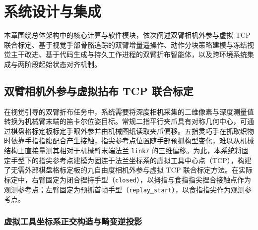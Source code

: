 \section{系统设计与集成}
\label{sec:design}

本章围绕总体架构中的核心计算与软件模块，依次阐述双臂相机外参与虚拟 TCP 联合标定、基于视觉手部骨骼追踪的双臂增量遥操作、动作分块策略建模与冻结视觉主干改进、基于代码生成与持久工作进程的双臂折布智能体，以及跨环境系统集成与两阶段起始状态对齐机制。

\subsection{双臂相机外参与虚拟拈布 TCP 联合标定}
\label{subsec:calibration}

在视觉引导的双臂折布任务中，系统需要将深度相机采集的二维像素与深度测量值转换为机械臂末端的笛卡尔位姿目标。常规二指平行夹爪具有对称几何中心，可通过棋盘格标定板标定手眼外参并由机械图纸读取夹爪偏移。五指灵巧手在抓取织物时依靠手指指腹配合产生接触，指尖参考点位置随手部预抓构型变化，难以从机械结构上直接量测其相对于机械臂末端法兰 \texttt{link7} 的三维偏移。为此，本系统将固定手型下的指尖参考点建模为固连于法兰坐标系的虚拟工具中心点（TCP），构建了无需外部棋盘格标定板的九自由度相机外参与虚拟 TCP 联合标定方法。在实际标定中，右臂固定为闭合捏持手型（\texttt{closed}），以拇指与食指指尖捏合接触点作为观测参考点；左臂固定为预抓首帧手型（\texttt{replay\_start}），以食指指尖作为观测参考点。

\subsubsection{虚拟工具坐标系正交构造与畸变逆投影}

